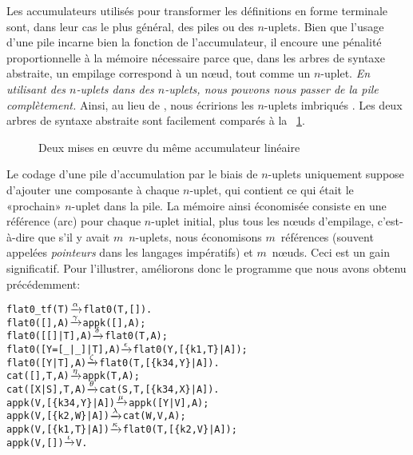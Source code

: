 Les accumulateurs utilisés pour transformer les définitions en forme
terminale sont, dans leur cas le plus général, des piles ou des
\(n\)-uplets. Bien que l'usage d'une pile incarne bien la fonction de
l'accumulateur, il encoure une pénalité proportionnelle à la mémoire
nécessaire parce que, dans les arbres de syntaxe abstraite, un
empilage correspond à un n{\oe}ud, tout comme un \(n\)-uplet. \emph{En
  utilisant des \(n\)-uplets dans des \(n\)-uplets, nous pouvons nous
  passer de la pile complètement.} Ainsi, au lieu de
\erlcode{[\{k3,\(X_1\)\},\{k1,\(V\),\(E\)\},\{k3,\(X_2\)\}]}, nous
écririons les \(n\)-uplets imbriqués
. Les
deux arbres de syntaxe abstraite sont facilement comparés à la
\fig~\ref{fig_tuple_vs_stack}.
\begin{figure}
\centering
{}
\caption{Deux mises en {\oe}uvre du même accumulateur linéaire
\label{fig_tuple_vs_stack}}
\end{figure}
Le codage d'une pile d'accumulation par le biais de \(n\)-uplets
uniquement suppose d'ajouter une composante à chaque \(n\)-uplet, qui
contient ce qui était le «prochain» \(n\)-uplet dans la pile. La
mémoire ainsi économisée consiste en une référence (arc) pour chaque
\(n\)-uplet initial, plus tous les n{\oe}uds d'empilage, c'est-à-dire
que s'il y avait \(m\)~\(n\)-uplets, nous économisons \(m\)~références
(souvent appelées \emph{pointeurs} dans les langages impératifs) et
\(m\)~n{\oe}uds. Ceci est un gain significatif. Pour l'illustrer,
améliorons donc le programme que nous avons obtenu précédemment:
\begin{alltt}
flat0\_tf(T)          \(\smashedrightarrow{\alpha}\) flat0(T,[]).
flat0(         [],A) \(\smashedrightarrow{\gamma}\) appk([],A);
flat0(     [[]|T],A) \(\smashedrightarrow{\delta}\) flat0(T,A);
flat0([Y=[\_|\_]|T],A) \(\smashedrightarrow{\epsilon}\) flat0(Y,[\{k1,T\}|A]);
flat0(    [Y|T],A)   \(\smashedrightarrow{\zeta}\) flat0(T,[\{k34,Y\}|A]).
cat(   [],T,A)       \(\smashedrightarrow{\eta}\) appk(T,A);
cat([X|S],T,A)       \(\smashedrightarrow{\theta}\) cat(S,T,[\{k34,X\}|A]).
appk(V,[\{k34,Y\}|A])  \(\smashedrightarrow{\mu}\) appk([Y|V],A);
appk(V, [\{k2,W\}|A])  \(\smashedrightarrow{\lambda}\) cat(W,V,A);
appk(V, [\{k1,T\}|A])  \(\smashedrightarrow{\kappa}\) flat0(T,[\{k2,V\}|A]);
appk(V,         [])  \(\smashedrightarrow{\iota}\) V.
\end{alltt}
